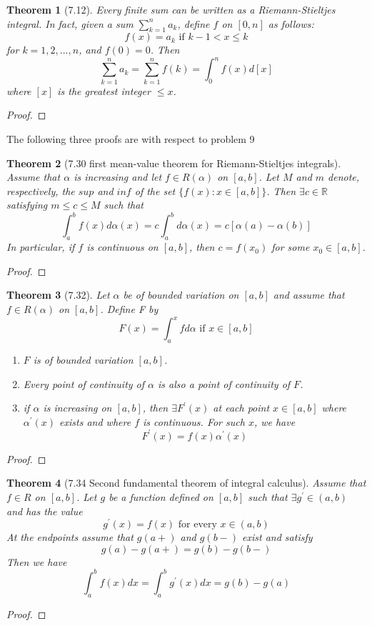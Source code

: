 \documentclass[aps,pra,notitlepage,amsmath,amssymb,letterpaper,12pt]{revtex4-1}
\newtheorem{theorem}{Theorem}
\begin{document}
\begin{theorem}[7.12]
Every finite sum can be written as a Riemann-Stieltjes integral. In fact, given a sum $\sum_{k=1}^{n} a_{k}$, define $f$ on $[0,n]$ as follows:
\[f(x) = a_{k}  \textrm{  if  }  k-1 < x \leq k\]
for $k=1,2,...,n$, and $f(0) = 0$. Then
\[\sum_{k=1}^{n}a_{k} = \sum_{k=1}^{n}f(k) = \int_{0}^{n}f(x)d[x]\]
where $[x]$ is the greatest integer $\leq x$.
\end{theorem}
\begin{proof}
\end{proof}

The following three proofs are with respect to problem 9
\begin{theorem}[7.30 first mean-value theorem for Riemann-Stieltjes integrals]
Assume that $\alpha$ is increasing and let $f \in R(\alpha)$ on $[a,b]$. Let $M$ and $m$ denote, respectively, the $sup$ and $inf$ of the set $\{f(x):x \in [a,b]\}$. Then $\exists c \in \mathbb{R}$ satisfying $m \leq c \leq M$ such that
\[\int_{a}^{b}f(x)d\alpha(x) = c\int_{a}^{b}d\alpha(x) = c[\alpha(a)-\alpha(b)]\]
In particular, if $f$ is continuous on $[a,b]$, then $c=f(x_{0})$ for some $x_{0} \in [a,b]$.
\end{theorem}
\begin{proof}
\end{proof}

\begin{theorem}[7.32]
Let $\alpha$ be of bounded variation on $[a,b]$ and assume that
$f \in R(\alpha)$ on $[a,b]$. Define F by
\[F(x)=\int_{a}^{x} f d \alpha \textrm{ if } x \in [a,b]\]
\begin{enumerate}[\upshape a)]
  \item $F$ is of bounded variation $[a,b]$.
  \item Every point of continuity of $\alpha$ is also a point of continuity of $F$.
  \item if $\alpha$ is increasing on $[a,b]$, then $\exists F^\prime(x)$ at each point $x \in [a,b]$ where $\alpha^\prime(x)$ exists and where $f$ is continuous. For such $x$, we have $$F^\prime(x) = f(x)\alpha^\prime(x)$$
\end{enumerate}
\end{theorem}
\begin{proof}
\end{proof}

\begin{theorem}[7.34 Second fundamental theorem of integral calculus]
Assume that $f \in R$ on $[a,b]$. Let $g$ be a function defined on $[a,b]$ such that $\exists g^\prime \in (a,b)$ and has the value
\[g^\prime(x) = f(x) \textrm{ for every } x \in (a,b)\]
At the endpoints assume that $g(a+)$ and $g(b-)$ exist and satisfy
\[g(a) - g(a+) = g(b) - g(b-)\]
Then we have
\[\int_{a}^{b} f(x)dx = \int_{a}^{b} g^\prime(x)dx = g(b) - g(a)\]
\end{theorem}
\begin{proof}
\end{proof}
\end{document}

